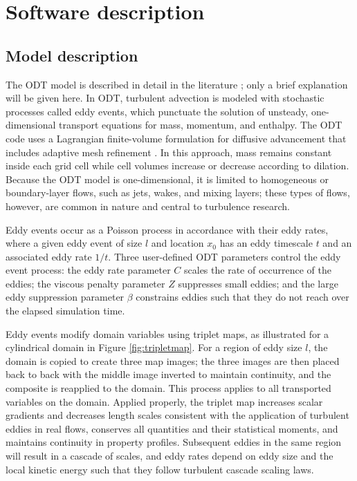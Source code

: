\documentclass[preprint,12pt, a4paper]{elsarticle}
\begin{document}
\section{Software description}
\label{sec:description}

\subsection{Model description}
\label{sub:model_description}

The ODT model is described in detail in the literature \cite{Kerstein_1999,Kerstein_2001,Ashurst_2005,Lignell_2018,Lignell_2013}; only a brief explanation will be given here. In ODT, turbulent advection is modeled with stochastic processes called eddy events, which punctuate the solution of unsteady, one-dimensional transport equations for mass, momentum, and enthalpy. The ODT code uses a Lagrangian finite-volume formulation for diffusive advancement that includes adaptive mesh refinement \cite{Lignell_2013}. In this approach, mass remains constant inside each grid cell while cell volumes increase or decrease according to dilation. Because the ODT model is one-dimensional, it is limited to homogeneous or boundary-layer flows, such as jets, wakes, and mixing layers; these types of flows, however, are common in nature and central to turbulence research.

Eddy events occur as a Poisson process in accordance with their eddy rates, where a given eddy event of size $l$ and location $x_0$ has an eddy timescale $t$ and an associated eddy rate $1/t$. Three user-defined ODT parameters control the eddy event process: the eddy rate parameter $C$ scales the rate of occurrence of the eddies; the viscous penalty parameter $Z$ suppresses small eddies; and the large eddy suppression parameter $\beta$ constrains eddies such that they do not reach over the elapsed simulation time. 

Eddy events modify domain variables using triplet maps, as illustrated for a cylindrical domain in Figure \ref{fig:tripletmap}. For a region of eddy size $l$, the domain is copied to create three map images; the three images are then placed back to back with the middle image inverted to maintain continuity, and the composite is reapplied to the domain. This process applies to all transported variables on the domain. Applied properly, the triplet map increases scalar gradients and decreases length scales consistent with the application of turbulent eddies in real flows, conserves all quantities and their statistical moments, and maintains continuity in property profiles. Subsequent eddies in the same region will result in a cascade of scales, and eddy rates depend on eddy size and the local kinetic energy such that they follow turbulent cascade scaling laws.  
\end{document}
